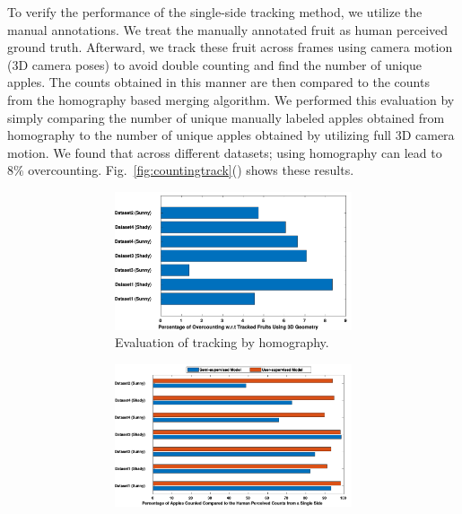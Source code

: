 To verify the performance of the single-side tracking method, we utilize the manual annotations. We treat the manually annotated fruit as human perceived ground truth. Afterward, we track these fruit across frames using camera motion (3D camera poses) to avoid double counting and find the number of unique apples. The counts obtained in this manner are then compared to the counts from the homography based merging algorithm. We performed this evaluation by simply comparing the number of unique manually labeled apples obtained from homography to the number of unique apples obtained by utilizing full 3D camera motion. We found that across different datasets; using homography can lead to $8\%$ overcounting. Fig.~\ref{fig:countingtrack}() shows these results. 
\begin{figure}[!hbpt]
        \centering
        \begin{subfigure}[b]{\textwidth}\begin{subfigure}[b]{.49\textwidth}
                 \includegraphics[width=\textwidth]{figures/map_yield/trackingbyHomography_.pdf}
                 \caption{Evaluation of tracking by homography.}
                     \label{fig:trackHom}   
        \end{subfigure}\begin{subfigure}[b]{.49\textwidth}
                         \includegraphics[width=\textwidth]{figures/map_yield/datasetWiseCountingModel_.pdf}

\end{subfigure}
\end{subfigure}
\end{figure}

